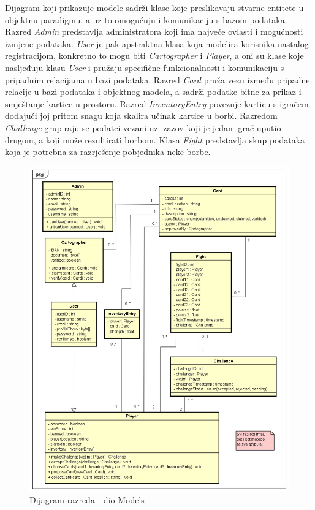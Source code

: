     		Dijagram koji prikazuje modele sadrži klase koje preslikavaju stvarne entitete u objektnu paradigmu, a uz to omogućuju i komunikaciju s bazom podataka. Razred \textit{Admin} predstavlja administratora koji ima najveće ovlasti i mogućnosti izmjene podataka. \textit{User} je pak apstraktna klasa koja modelira korisnika nastalog registracijom, konkretno to mogu biti \textit{Cartographer} i \textit{Player}, a oni su klase koje nasljeđuju klasu \textit{User} i pružaju specifične funkcionalnosti i komunikaciju s pripadnim relacijama u bazi podataka. Razred \textit{Card} pruža vezu između pripadne relacije u bazi podataka i objektnog modela, a sadrži podatke bitne za prikaz i smještanje kartice u prostoru. Razred \textit{InventoryEntry} povezuje karticu s igračem dodajući joj pritom snagu koja skalira učinak kartice u borbi. Razredom \textit{Challenge} grupiraju se podatci vezani uz izazov koji je jedan igrač uputio drugom, a koji može rezultirati borbom. Klasa \textit{Fight} predstavlja skup podataka koja je potrebna za razrješenje pobjednika neke borbe.
			
			\begin{figure}[H]
        			\includegraphics[width=\textwidth]{slike/ClassDiagrams/Models.png}
        			\centering
        			\caption{Dijagram razreda - dio Models}
        			\label{fig:classDiagramModels}
        		\end{figure}
        		
